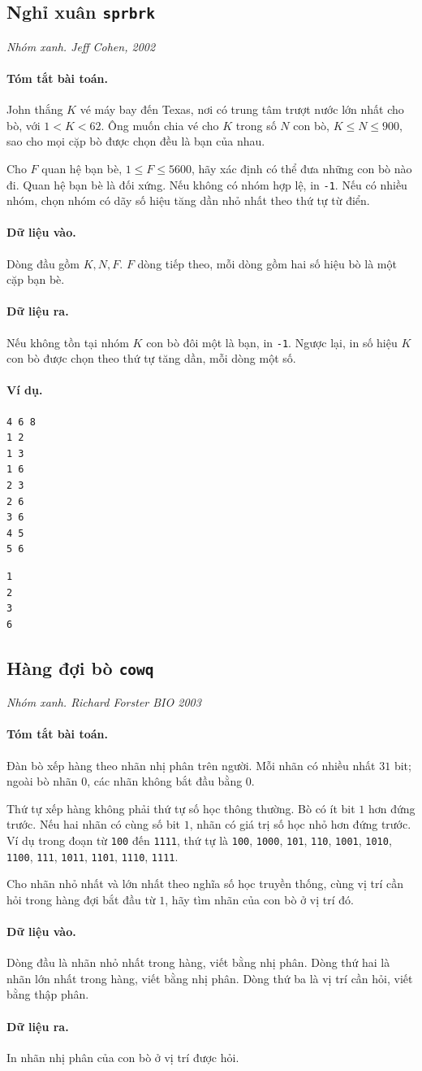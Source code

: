 \documentclass[11pt]{article}
\newcommand{\problem}[4]{%
  \subsection[#1 (#2)]{#1 \hfill {\normalsize\texttt{#2}}}%
  \noindent\textit{#3. #4}\par\smallskip
}
\newcommand{\iosec}[1]{\paragraph{#1}}
\begin{document}
\problem{Nghỉ xuân}{sprbrk}{Nhóm xanh}{Jeff Cohen, 2002}

\iosec{Tóm tắt bài toán.}
John thắng \(K\) vé máy bay đến Texas, nơi có trung tâm trượt nước lớn nhất
cho bò, với \(1<K<62\). Ông muốn chia vé cho \(K\) trong số \(N\) con bò,
\(K\le N\le 900\), sao cho mọi cặp bò được chọn đều là bạn của nhau.

Cho \(F\) quan hệ bạn bè, \(1\le F\le 5600\), hãy xác định có thể đưa những
con bò nào đi. Quan hệ bạn bè là đối xứng. Nếu không có nhóm hợp lệ, in
\texttt{-1}. Nếu có nhiều nhóm, chọn nhóm có dãy số hiệu tăng dần nhỏ nhất
theo thứ tự từ điển.

\iosec{Dữ liệu vào.}
Dòng đầu gồm \(K,N,F\). \(F\) dòng tiếp theo, mỗi dòng gồm hai số hiệu bò là
một cặp bạn bè.

\iosec{Dữ liệu ra.}
Nếu không tồn tại nhóm \(K\) con bò đôi một là bạn, in \texttt{-1}. Ngược lại,
in số hiệu \(K\) con bò được chọn theo thứ tự tăng dần, mỗi dòng một số.

\iosec{Ví dụ.}
\begin{verbatim}
4 6 8
1 2
1 3
1 6
2 3
2 6
3 6
4 5
5 6
\end{verbatim}

\begin{verbatim}
1
2
3
6
\end{verbatim}

\problem{Hàng đợi bò}{cowq}{Nhóm xanh}{Richard Forster BIO 2003}

\iosec{Tóm tắt bài toán.}
Đàn bò xếp hàng theo nhãn nhị phân trên người. Mỗi nhãn có nhiều nhất \(31\)
bit; ngoài bò nhãn \(0\), các nhãn không bắt đầu bằng \(0\).

Thứ tự xếp hàng không phải thứ tự số học thông thường. Bò có ít bit \(1\) hơn
đứng trước. Nếu hai nhãn có cùng số bit \(1\), nhãn có giá trị số học nhỏ hơn
đứng trước. Ví dụ trong đoạn từ \texttt{100} đến \texttt{1111}, thứ tự là
\texttt{100}, \texttt{1000}, \texttt{101}, \texttt{110}, \texttt{1001},
\texttt{1010}, \texttt{1100}, \texttt{111}, \texttt{1011}, \texttt{1101},
\texttt{1110}, \texttt{1111}.

Cho nhãn nhỏ nhất và lớn nhất theo nghĩa số học truyền thống, cùng vị trí cần
hỏi trong hàng đợi bắt đầu từ \(1\), hãy tìm nhãn của con bò ở vị trí đó.

\iosec{Dữ liệu vào.}
Dòng đầu là nhãn nhỏ nhất trong hàng, viết bằng nhị phân. Dòng thứ hai là nhãn
lớn nhất trong hàng, viết bằng nhị phân. Dòng thứ ba là vị trí cần hỏi, viết
bằng thập phân.

\iosec{Dữ liệu ra.}
In nhãn nhị phân của con bò ở vị trí được hỏi.
\end{document}

